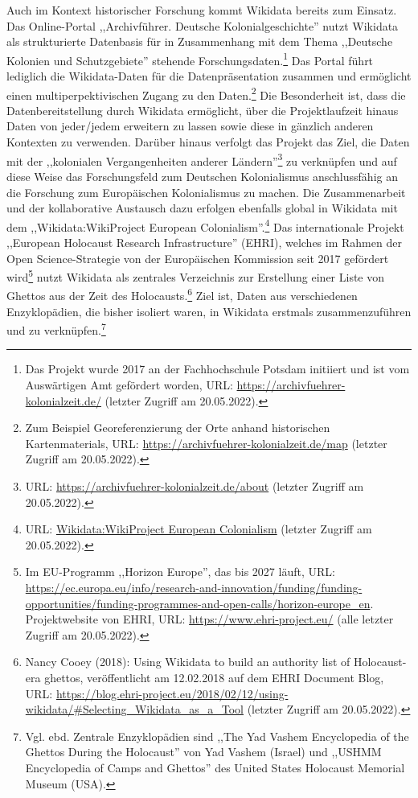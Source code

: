 Auch im Kontext historischer Forschung kommt Wikidata bereits zum Einsatz. Das Online-Portal ,,Archivführer. Deutsche Kolonialgeschichte'' nutzt Wikidata als strukturierte Datenbasis für in Zusammenhang mit dem Thema ,,Deutsche Kolonien und Schutzgebiete'' stehende Forschungsdaten.\footnote{Das Projekt wurde 2017 an der Fachhochschule Potsdam initiiert und ist vom Auswärtigen Amt gefördert worden, URL: \url{https://archivfuehrer-kolonialzeit.de/} (letzter Zugriff am 20.05.2022).} Das Portal führt lediglich die Wikidata-Daten für die Datenpräsentation zusammen und ermöglicht einen multiperpektivischen Zugang zu den Daten.\footnote{Zum Beispiel Georeferenzierung der Orte anhand historischen Kartenmaterials, URL: \url{https://archivfuehrer-kolonialzeit.de/map} (letzter Zugriff am 20.05.2022).} Die Besonderheit ist, dass die Datenbereitstellung durch Wikidata ermöglicht, über die Projektlaufzeit hinaus Daten von jeder/jedem erweitern zu lassen sowie diese in gänzlich anderen Kontexten zu verwenden. Darüber hinaus verfolgt das Projekt das Ziel, die Daten mit der ,,kolonialen Vergangenheiten anderer Ländern''\footnote{URL: \url{https://archivfuehrer-kolonialzeit.de/about} (letzter Zugriff am 20.05.2022).} zu verknüpfen und auf diese Weise das Forschungsfeld zum Deutschen Kolonialismus anschlussfähig an die Forschung zum Europäischen Kolonialismus zu machen. Die Zusammenarbeit und der kollaborative Austausch dazu erfolgen ebenfalls global in Wikidata mit dem ,,Wikidata:WikiProject European Colonialism''.\footnote{URL: \url{Wikidata:WikiProject European Colonialism} (letzter Zugriff am 20.05.2022).} Das internationale Projekt ,,European Holocaust Research Infrastructure'' (EHRI), welches im Rahmen der Open Science-Strategie von der Europäischen Kommission seit 2017 gefördert wird\footnote{Im EU-Programm ,,Horizon Europe'', das bis 2027 läuft, URL: \url{https://ec.europa.eu/info/research-and-innovation/funding/funding-opportunities/funding-programmes-and-open-calls/horizon-europe_en}. Projektwebsite von EHRI, URL: \url{https://www.ehri-project.eu/} (alle letzter Zugriff am 20.05.2022).} nutzt Wikidata als zentrales Verzeichnis zur Erstellung einer Liste von Ghettos aus der Zeit des Holocausts.\footnote{Nancy Cooey (2018): Using Wikidata to build an authority list of Holocaust-era ghettos, veröffentlicht am 12.02.2018 auf dem EHRI Document Blog, URL: \url{https://blog.ehri-project.eu/2018/02/12/using-wikidata/\#Selecting\_Wikidata\_as\_a\_Tool} (letzter Zugriff am 20.05.2022).} Ziel ist, Daten aus verschiedenen Enzyklopädien, die bisher isoliert waren, in Wikidata erstmals zusammenzuführen und zu verknüpfen.\footnote{Vgl. ebd. Zentrale Enzyklopädien sind ,,The Yad Vashem Encyclopedia of the Ghettos During the Holocaust'' von Yad Vashem (Israel) und ,,USHMM Encyclopedia of Camps and Ghettos'' des United States Holocaust Memorial Museum (USA).}

